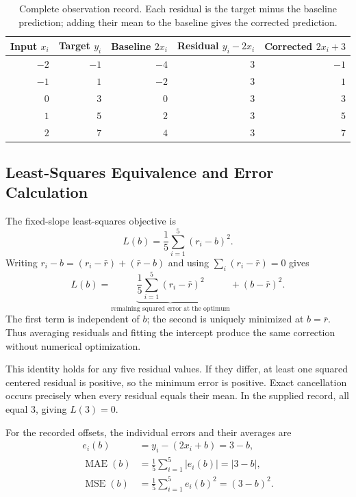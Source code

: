 \documentclass[11pt]{article}
\begin{document}
\begin{table}[htbp]
    \centering
    \caption{Complete observation record. Each residual is the target minus the baseline prediction; adding their mean to the baseline gives the corrected prediction.}
    \label{tab:observations}
    \begin{tabular}{rrrrr}
        \toprule
        \shortstack[r]{Input\\$x_i$} &
        \shortstack[r]{Target\\$y_i$} &
        \shortstack[r]{Baseline\\$2x_i$} &
        \shortstack[r]{Residual\\$y_i-2x_i$} &
        \shortstack[r]{Corrected\\$2x_i+3$} \\
        \midrule
        $-2$ & $-1$ & $-4$ & $3$ & $-1$ \\
        $-1$ & $1$  & $-2$ & $3$ & $1$  \\
        $0$  & $3$  & $0$  & $3$ & $3$  \\
        $1$  & $5$  & $2$  & $3$ & $5$  \\
        $2$  & $7$  & $4$  & $3$ & $7$  \\
        \bottomrule
    \end{tabular}
\end{table}

\subsection{Least-Squares Equivalence and Error Calculation}
\label{sec:least_squares}

The fixed-slope least-squares objective is
\[
L(b)=\frac{1}{5}\sum_{i=1}^{5}(r_i-b)^2.
\]
Writing $r_i-b=(r_i-\bar r)+(\bar r-b)$ and using
$\sum_i(r_i-\bar r)=0$ gives
\[
L(b)=
\underbrace{\frac{1}{5}\sum_{i=1}^{5}(r_i-\bar r)^2}
_{\text{remaining squared error at the optimum}}
+(b-\bar r)^2.
\]
The first term is independent of $b$; the second is uniquely minimized at $b=\bar r$. Thus averaging residuals and fitting the intercept produce the same correction without numerical optimization.

This identity holds for any five residual values. If they differ, at least one squared centered residual is positive, so the minimum error is positive. Exact cancellation occurs precisely when every residual equals their mean. In the supplied record, all equal $3$, giving $L(3)=0$.

For the recorded offsets, the individual errors and their averages are
\[
\begin{aligned}
e_i(b)&=y_i-(2x_i+b)=3-b,\\
\operatorname{MAE}(b)&=\frac{1}{5}\sum_{i=1}^{5}|e_i(b)|=|3-b|,\\
\operatorname{MSE}(b)&=\frac{1}{5}\sum_{i=1}^{5}e_i(b)^2=(3-b)^2.
\end{aligned}
\]
\end{document}

